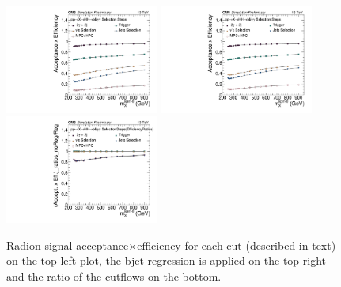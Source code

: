 \begin{figure}[thb]
  \centering
  \includegraphics[width=0.45\textwidth]{figures/sec-efficiency_plots/res_effs_Radion.pdf}\hfil
  \includegraphics[width=0.45\textwidth]{figures/sec-efficiency_plots/wRegression/res_effs_Radion_reg.pdf}\hfil
  \includegraphics[width=0.45\textwidth]{figures/sec-efficiency_plots/wRegression/res_effs_Radion_regRatio.pdf}\hfil
  \caption{Radion signal acceptance$\times$efficiency for each cut (described in text) on the top left plot, the bjet regression is applied on the top right and the ratio of the cutflows on the bottom.}
  \label{fig:cutflow-signal-Radion}
\end{figure}

